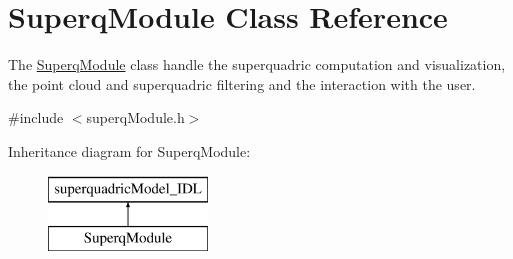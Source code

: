 \section{Superq\-Module Class Reference}
\label{classSuperqModule}


The \hyperlink{classSuperqModule}{Superq\-Module} class handle the superquadric computation and visualization, the point cloud and superquadric filtering and the interaction with the user.  




{\ttfamily \#include $<$superq\-Module.\-h$>$}

Inheritance diagram for Superq\-Module\-:\begin{figure}[H]
\begin{center}
\leavevmode
\includegraphics[height=2.000000cm]{classSuperqModule}
\end{center}
\end{figure}
